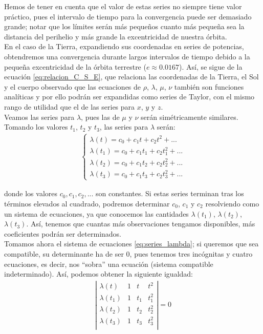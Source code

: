 \documentclass[11pt]{article}
\begin{document}
Hemos de tener en cuenta que el valor de estas series no siempre tiene valor práctico, pues el intervalo de tiempo para la convergencia puede ser demasiado grande; notar que los límites serán más pequeños cuanto más pequeña sea la distancia del perihelio y más grande la excentricidad de nuestra órbita.\\

En el caso de la Tierra, expandiendo sus coordenadas en series de potencias, obtendremos una convergencia durante largos intervalos de tiempo debido a la pequeña excentricidad de la órbita terrestre ($e\approx0.0167$). Así, se sigue de la ecuación \eqref{eq:relacion_C_S_E}, que relaciona las coordenadas de la Tierra, el Sol y el cuerpo observado que las ecuaciones de $\rho$, $\lambda$, $\mu$, $\nu$ también son funciones analíticas y por ello podrán ser expandidas como series de Taylor, con el mismo rango de utilidad que el de las series para $x$, $y$ y $z$.\\

Veamos las series para $\lambda$, pues las de $\mu$ y $\nu$ serán simétricamente similares. Tomando los valores $t_1$, $t_2$ y $t_3$, las series para $\lambda$ serán:
\begin{align}
\left\{
\begin{array}{l}
	\lambda(t)=c_0+c_1t+c_2t^2+...\\
	\lambda(t_1)=c_0+c_1t_1+c_2t_1^2+...\\
	\lambda(t_2)=c_0+c_1t_2+c_2t_2^2+...\\
	\lambda(t_3)=c_0+c_1t_3+c_2t_3^2+...
\end{array}
\right.
\label{eq:series_lambda}
\end{align}

\noindent donde los valores $c_0, c_1, c_2, ...$ son constantes. Si estas series terminan tras los términos elevados al cuadrado, podremos determinar $c_0$, $c_1$ y $c_2$ resolviendo como un sistema de ecuaciones, ya que conocemos las cantidades $\lambda(t_1)$, $\lambda(t_2)$, $\lambda(t_3)$. Así, tenemos que cuantas más observaciones tengamos disponibles, más coeficientes podrán ser determinados.\\

Tomamos ahora el sistema de ecuaciones \eqref{eq:series_lambda}; si queremos que sea compatible, su determinante ha de ser 0, pues tenemos tres incógnitas y cuatro ecuaciones, es decir, nos ``sobra'' una ecuación (sistema compatible indeterminado). Así, podemos obtener la siguiente igualdad:
\begin{align}
\left|
\begin{array}{cccc}
\lambda(t)   & 1 & t   & t^2  \\
\lambda(t_1) & 1 & t_1 & t^2_1\\
\lambda(t_2) & 1 & t_2 & t^2_2\\
\lambda(t_3) & 1 & t_3 & t^2_3\\
\end{array}
\right|
=0
\label{eq:resultante}
\end{align}
\end{document}
